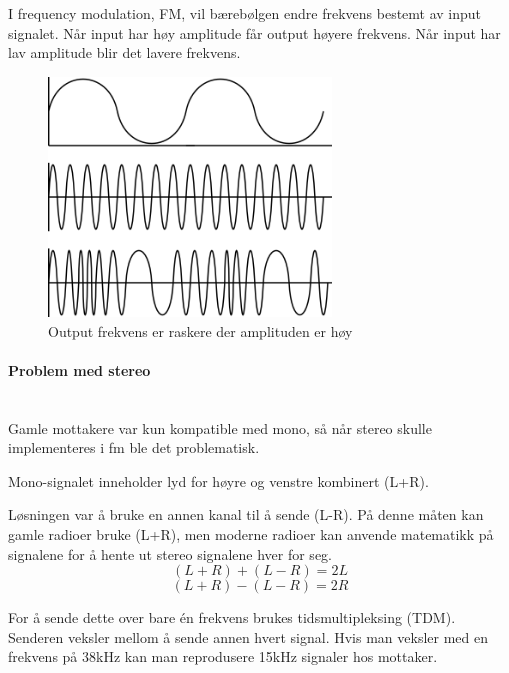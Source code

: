 I frequency modulation, FM, vil bærebølgen endre frekvens bestemt av
input signalet.
Når input har høy amplitude får output høyere frekvens.
Når input har lav amplitude blir det lavere frekvens.

\begin{figure}[H]
  \centering
  \includegraphics[width=0.67\textwidth]{./img/fm}
  \caption{Output frekvens er raskere der amplituden er høy}
\end{figure}



\paragraph{Problem med stereo} \mbox{} \\
Gamle mottakere var kun kompatible med mono, så når stereo skulle implementeres
i fm ble det problematisk.

Mono-signalet inneholder lyd for høyre og venstre kombinert (L+R).

Løsningen var å bruke en annen kanal til å sende (L-R).
På denne måten kan gamle radioer bruke (L+R), men moderne radioer kan anvende
matematikk på signalene for å hente ut stereo signalene hver for seg.
$$(L+R)+(L-R)=2L$$
$$(L+R)-(L-R)=2R$$

For å sende dette over bare én frekvens brukes tidsmultipleksing (TDM).
Senderen veksler mellom å sende annen hvert signal.
Hvis man veksler med en frekvens på 38kHz kan man reprodusere 15kHz signaler
hos mottaker.
